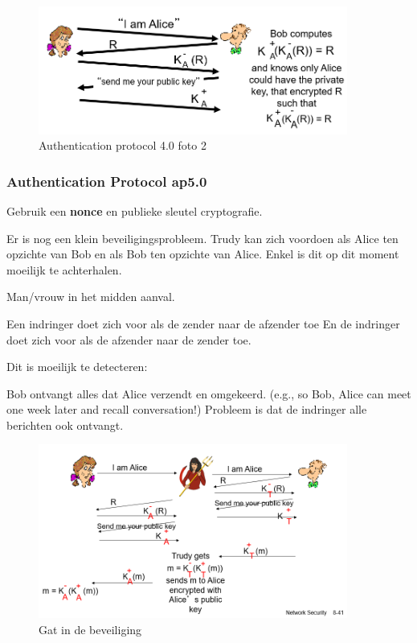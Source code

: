 \begin{figure}[h]
    \centering
    \includegraphics[width=4in]{./img/imghfdst8/hfdst8puntje21.png}
    \caption{Authentication protocol 4.0 foto 2 }      
    \label{fig:Authentication protocol 4.0 foto 2 }
\end{figure}
 

\subsubsection{Authentication Protocol ap5.0}

Gebruik een \textbf{nonce} en publieke sleutel cryptografie.

\noindent Er is nog een klein beveiligingsprobleem. Trudy kan zich voordoen als Alice ten opzichte van Bob en als Bob ten opzichte van Alice. Enkel is dit op dit moment moeilijk te achterhalen.


Man/vrouw in het midden aanval.

\fra Een indringer doet zich voor als de zender naar de afzender toe
\fra En de indringer doet zich voor als de afzender naar de zender toe.

\noindent Dit is moeilijk te detecteren:

\bi
\itf 	Bob ontvangt alles dat Alice verzendt en omgekeerd. (e.g., so Bob, Alice can meet one week later and recall conversation!)
\itf Probleem is dat de indringer alle berichten ook ontvangt.
\ei

\begin{figure}[h]
    \centering
   \includegraphics[width=4in]{./img/imghfdst8/hfdst8puntje22.png}
    \caption{Gat in de beveiliging }      
    \label{fig:Gat in de beveiliging }
\end{figure}